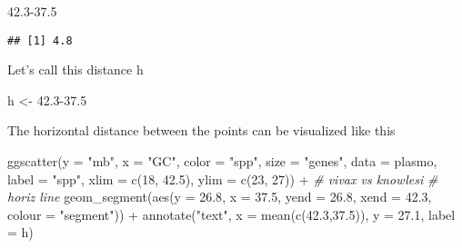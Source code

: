 \documentclass[
]{book}
\newenvironment{Shaded}{\begin{snugshade}}{\end{snugshade}}
\newcommand{\AttributeTok}[1]{\textcolor[rgb]{0.77,0.63,0.00}{#1}}
\newcommand{\CommentTok}[1]{\textcolor[rgb]{0.56,0.35,0.01}{\textit{#1}}}
\newcommand{\DecValTok}[1]{\textcolor[rgb]{0.00,0.00,0.81}{#1}}
\newcommand{\FloatTok}[1]{\textcolor[rgb]{0.00,0.00,0.81}{#1}}
\newcommand{\FunctionTok}[1]{\textcolor[rgb]{0.00,0.00,0.00}{#1}}
\newcommand{\NormalTok}[1]{#1}
\newcommand{\OtherTok}[1]{\textcolor[rgb]{0.56,0.35,0.01}{#1}}
\newcommand{\SpecialCharTok}[1]{\textcolor[rgb]{0.00,0.00,0.00}{#1}}
\newcommand{\StringTok}[1]{\textcolor[rgb]{0.31,0.60,0.02}{#1}}
\begin{document}
\begin{Shaded}
\begin{Highlighting}[]
\FloatTok{42.3{-}37.5}
\end{Highlighting}
\end{Shaded}

\begin{verbatim}
## [1] 4.8
\end{verbatim}

Let's call this distance h

\begin{Shaded}
\begin{Highlighting}[]
\NormalTok{h }\OtherTok{\textless{}{-}} \FloatTok{42.3{-}37.5}
\end{Highlighting}
\end{Shaded}

The horizontal distance between the points can be visualized like this

\begin{Shaded}
\begin{Highlighting}[]
\FunctionTok{ggscatter}\NormalTok{(}\AttributeTok{y =} \StringTok{"mb"}\NormalTok{,}
          \AttributeTok{x =} \StringTok{"GC"}\NormalTok{,}
          \AttributeTok{color =} \StringTok{"spp"}\NormalTok{,}
          \AttributeTok{size =} \StringTok{"genes"}\NormalTok{,}
          \AttributeTok{data =}\NormalTok{ plasmo,}
          \AttributeTok{label =} \StringTok{"spp"}\NormalTok{,}
          \AttributeTok{xlim =} \FunctionTok{c}\NormalTok{(}\DecValTok{18}\NormalTok{, }\FloatTok{42.5}\NormalTok{),}
          \AttributeTok{ylim =} \FunctionTok{c}\NormalTok{(}\DecValTok{23}\NormalTok{, }\DecValTok{27}\NormalTok{)) }\SpecialCharTok{+}
    \CommentTok{\# vivax vs knowlesi}
   \CommentTok{\# horiz line}
   \FunctionTok{geom\_segment}\NormalTok{(}\FunctionTok{aes}\NormalTok{(}\AttributeTok{y    =} \FloatTok{26.8}\NormalTok{,    }\AttributeTok{x =} \FloatTok{37.5}\NormalTok{,}
                   \AttributeTok{yend =} \FloatTok{26.8}\NormalTok{, }\AttributeTok{xend =} \FloatTok{42.3}\NormalTok{,}
                   \AttributeTok{colour =} \StringTok{"segment"}\NormalTok{)) }\SpecialCharTok{+}
  \FunctionTok{annotate}\NormalTok{(}\StringTok{"text"}\NormalTok{,}
           \AttributeTok{x =} \FunctionTok{mean}\NormalTok{(}\FunctionTok{c}\NormalTok{(}\FloatTok{42.3}\NormalTok{,}\FloatTok{37.5}\NormalTok{)), }
           \AttributeTok{y =} \FloatTok{27.1}\NormalTok{,}
           \AttributeTok{label =}\NormalTok{ h)}
\end{Highlighting}
\end{Shaded}
\end{document}
